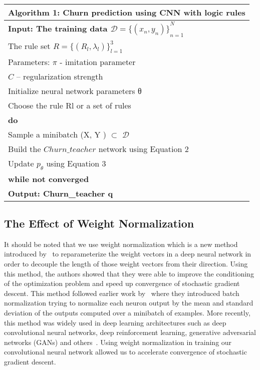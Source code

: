 \documentclass[11pt,letterpaper]{article}
\begin{document}
\begin{table}
\small
\centering
\begin{tabular}{l}
\hline \bf Algorithm 1: Churn prediction using CNN with logic rules  \\ \hline
\bf Input: The training data \(\mathcal{D}={\{(x_n,y_n)\}}_{n=1}^N\) \\ \hline
The rule set \(R={\{(R_l,\lambda_l)\}}_{l=1}^3 \) \\ 
Parameters:    \(\pi\)  - imitation parameter \\
                        \qquad \qquad \; \;  \(C\) – regularization strength \\

Initialize neural network parameters θ \\
Choose the rule Rl or a set of rules \\
\bf do \\
         \qquad Sample a minibatch (X, Y ) \(\subset\) \(\mathcal{D}\) \\
         \qquad Build the  \(Churn\_teacher\) network using Equation 2 \\
         \qquad Update \(p_\theta\) using  Equation 3 \\
\bf while not converged  \\ \hline
\bf Output: Churn\_teacher q \\
\hline
\end{tabular}
\end{table}


\subsection{The Effect of Weight Normalization}

It should be noted that we use weight normalization which is a new method introduced by~\cite{salimans} to reparameterize the weight vectors in a deep neural network in order to decouple the length of those weight vectors from their direction. Using this method, the authors showed that they were able to improve the conditioning of the optimization problem and speed up convergence of stochastic gradient descent. This method followed earlier work by~\cite{ioffe} where they introduced batch normalization trying to normalize each neuron output by the mean and standard deviation of the outputs computed over a minibatch of examples. More recently, this method was widely used in deep learning architectures such as deep convolutional neural networks, deep reinforcement learning, generative adversarial networks (GANs) and others~\cite{smith2016deep,gehring}. Using weight normalization in training our convolutional neural network allowed us to accelerate convergence of stochastic gradient descent.
\end{document}
